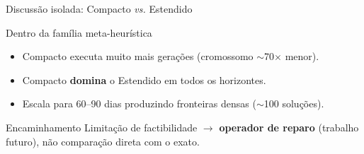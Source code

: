 \begin{frame}{Discussão isolada: Compacto \emph{vs.} Estendido}

    \begin{block}{Dentro da família meta-heurística}
        \begin{itemize}
            \item Compacto executa muito mais gerações (cromossomo $\sim$70$\times$ menor).
            \item Compacto \textbf{domina} o Estendido em todos os horizontes.
            \item Escala para 60--90 dias produzindo fronteiras densas ($\sim$100 soluções).
        \end{itemize}
    \end{block}

    \begingroup
    \begin{block}{Encaminhamento}
        Limitação de factibilidade $\rightarrow$ \textbf{operador de reparo} (trabalho futuro), não comparação direta com o exato.
    \end{block}
    \endgroup
\end{frame}
